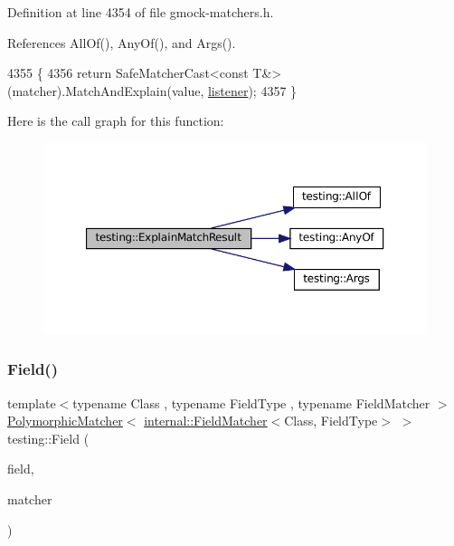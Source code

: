 Definition at line 4354 of file gmock-\/matchers.\+h.



References All\+Of(), Any\+Of(), and Args().


\begin{DoxyCode}
4355                                                               \{
4356   \textcolor{keywordflow}{return} SafeMatcherCast<const T&>(matcher).MatchAndExplain(value, \hyperlink{namespaceinteractive__marker_a0e579ab555212bb5e2c9f8a675b7618a}{listener});
4357 \}
\end{DoxyCode}
Here is the call graph for this function\+:
\nopagebreak
\begin{figure}[H]
\begin{center}
\leavevmode
\includegraphics[width=350pt]{namespacetesting_a6d5fbd5104dafc63bf705dafbcb5ce18_cgraph}
\end{center}
\end{figure}
\mbox{\label{namespacetesting_a4df3849391696aa93ac3a7703a717c2a}} 
\subsubsection{\texorpdfstring{Field()}{Field()}}
{\footnotesize\ttfamily template$<$typename Class , typename Field\+Type , typename Field\+Matcher $>$ \\
\hyperlink{classtesting_1_1PolymorphicMatcher}{Polymorphic\+Matcher}$<$ \hyperlink{classtesting_1_1internal_1_1FieldMatcher}{internal\+::\+Field\+Matcher}$<$Class, Field\+Type$>$ $>$ testing\+::\+Field (\begin{DoxyParamCaption}\item[{Field\+Type Class\+::$\ast$}]{field,  }\item[{const Field\+Matcher \&}]{matcher }\end{DoxyParamCaption})\hspace{0.3cm}{\ttfamily [inline]}}




